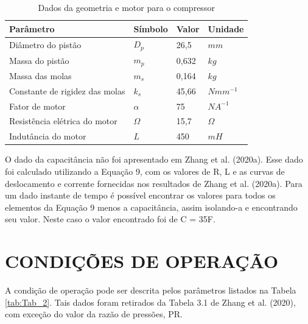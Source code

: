 \begin{table}[htb]
	\ABNTEXfontereduzida
	\caption{\label{tab:Tab_1} Dados da geometria e motor para o compressor}
	\begin{center}
	\begin{tabular}{p{5.0cm}p{1.5cm}p{2cm}p{2.5cm}}
		\toprule
		\textbf{Parâmetro} &  \textbf{Símbolo}      & \textbf{Valor} & \textbf{Unidade}    \\ \midrule
	Diâmetro do pistão                 & $D_p$              & 26,5              & $mm$                                      \\
		Massa do pistão                    & $m_p$          & 0,632            & $kg$                                        \\
		Massa das molas                    & $m_s$          & 0,164             & $kg$                                       \\
		Constante de rigidez das molas     & $k_s$          & 45,66             & $Nmm^{-1}$                                  \\
        Fator de motor                     & $\alpha$       & 75             & $NA^{-1}$                                        \\ 
		Resistência elétrica do motor      & $\Omega$       & 15,7             & $\Omega$                                     \\ 
		Indutância do motor                & $L$            & 450             & $mH$                                            \\ \bottomrule
	\end{tabular}
	\end{center}
\end{table}

O dado da capacitância não foi apresentado em Zhang et al. (2020a). Esse dado foi calculado utilizando a Equação 9, com os valores de R, L e as curvas de deslocamento e corrente fornecidas nos resultados de Zhang et al. (2020a). Para um dado instante de tempo é possível encontrar os valores para todos os elementos da Equação 9 menos a capacitância, assim isolando-a e encontrando seu valor. Neste caso o valor encontrado foi de C = 35F.

\section{CONDIÇÕES DE OPERAÇÃO}

A condição de operação pode ser descrita pelos parâmetros listados na Tabela \ref{tab:Tab_2}. Tais dados foram retirados da Tabela 3.1 de Zhang et al. (2020), com exceção do valor da razão de pressões, PR. 



